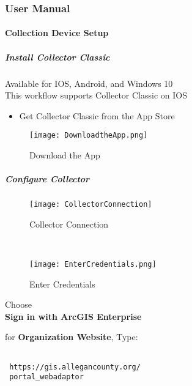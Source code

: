  
  \clearpage
  \subsubsection[User Manual]{\Large User Manual}
  \paragraph{Collection Device Setup}
  \subparagraph{Install Collector Classic}
	\noindent Available for IOS, Android, and Windows 10\\
	\noindent This workflow supports Collector Classic on IOS
  \begin{itemize}
  \item Get Collector Classic from the App Store
  \end{itemize}
  \begin{figure}[h!]
  \centering
      \texttt{[image: DownloadtheApp.png]}
  \caption{Download the App}
  \end{figure}
  \clearpage
  \subparagraph[Configure Collector]{\Large Configure Collector}
  \begin{wrapfigure}{r}{0.5\textwidth}
  \centering
  \texttt{[image: CollectorConnection]}
  \caption{Collector Connection}

  \HRule \\[.4cm] %
  \vspace{.1in}

      \texttt{[image: EnterCredentials.png]}
  \vspace{-.1in}

  \caption{Enter Credentials}
  \end{wrapfigure}

  Choose\\
  \noindent \textbf{Sign in with ArcGIS Enterprise}
  
 \vspace{.25in}
  
 for \textbf{Organization Website}, Type:
  
 \vspace{.1in}

 \begin{verbatim}

 https://gis.allegancounty.org/
 portal_webadaptor

 \end{verbatim}

